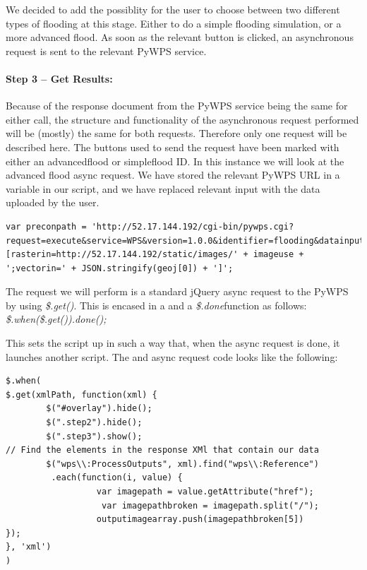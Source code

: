 We decided to add the possiblity for the user to choose between two different types of flooding at this stage. Either to do a simple flooding simulation, or a more advanced flood.
As soon as the relevant button is clicked, an asynchronous request is sent to the relevant PyWPS service.\\

\paragraph{Step 3 – Get Results:}
Because of the response document from the PyWPS service being the same for either call, the structure and functionality of the asynchronous request performed will be (mostly) the same for both requests. Therefore only one request will be described here. 
The buttons used to send the request have been marked with either an advancedflood or simpleflood ID. In this instance we will look at the advanced flood async request.
We have stored the relevant PyWPS URL in a variable in our script, and we have replaced relevant input with the data uploaded by the user. 

\begin{lstlisting}
var preconpath = 'http://52.17.144.192/cgi-bin/pywps.cgi?request=execute&service=WPS&version=1.0.0&identifier=flooding&datainputs=[rasterin=http://52.17.144.192/static/images/' + imageuse + ';vectorin=' + JSON.stringify(geoj[0]) + ']';
\end{lstlisting}

The request we will perform is a standard jQuery async request to the PyWPS by using \textit{\$.get()}. This is encased in a  and a \textit{\$.done}function as follows: \textit{\$.when(\$.get()).done();}

This sets the script up in such a way that, when the async request is done, it launches another script. 
The  and async request code looks like the following:

\begin{lstlisting}
$.when(
$.get(xmlPath, function(xml) {
        $("#overlay").hide();
        $(".step2").hide();
        $(".step3").show();
// Find the elements in the response XMl that contain our data
        $("wps\\:ProcessOutputs", xml).find("wps\\:Reference")
         .each(function(i, value) {
                  var imagepath = value.getAttribute("href");
                   var imagepathbroken = imagepath.split("/");
                  outputimagearray.push(imagepathbroken[5])
});
}, 'xml')
)
\end{lstlisting}


